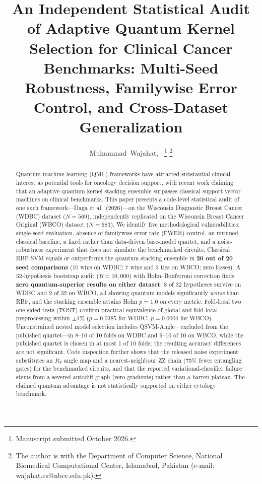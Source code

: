 \documentclass[journal,twocolumn]{IEEEtran}
\begin{document}

\title{An Independent Statistical Audit of Adaptive Quantum Kernel Selection for Clinical Cancer Benchmarks: Multi-Seed Robustness, Familywise Error Control, and Cross-Dataset Generalization}

\author{Muhammad~Wajahat,~%
\thanks{Manuscript submitted October 2026.}%
\thanks{The author is with the Department of Computer Science, National Biomedical Computational Center, Islamabad, Pakistan (e-mail: wajahat.cs@nbcc.edu.pk).}}

\maketitle

\begin{abstract}
Quantum machine learning (QML) frameworks have attracted substantial clinical interest as potential tools for oncology decision support, with recent work claiming that an adaptive quantum kernel stacking ensemble surpasses classical support vector machines on clinical benchmarks. This paper presents a code-level statistical audit of one such framework---Daga et al.\ (2026)---on the Wisconsin Diagnostic Breast Cancer (WDBC) dataset ($N=569$), independently replicated on the Wisconsin Breast Cancer Original (WBCO) dataset ($N=683$). We identify five methodological vulnerabilities: single-seed evaluation, absence of familywise error rate (FWER) control, an untuned classical baseline, a fixed rather than data-driven base-model quartet, and a noise-robustness experiment that does not simulate the benchmarked circuits. Classical RBF-SVM equals or outperforms the quantum stacking ensemble in \textbf{20 out of 20 seed comparisons} (10 wins on WDBC; 7 wins and 3 ties on WBCO; zero losses). A 32-hypothesis bootstrap audit ($B=10{,}000$) with Holm--Bonferroni correction finds \textbf{zero quantum-superior results on either dataset}: 8 of 32 hypotheses survive on WDBC and 2 of 32 on WBCO, all showing quantum models significantly \emph{worse} than RBF, and the stacking ensemble attains Holm $p=1.0$ on every metric. Fold-local two one-sided tests (TOST) confirm practical equivalence of global and fold-local preprocessing within $\pm 1\%$ ($p = 0.0385$ for WDBC, $p = 0.0004$ for WBCO). Unconstrained nested model selection includes QSVM-Angle---excluded from the published quartet---in 8--10 of 10 folds on WDBC and 9--10 of 10 on WBCO, while the published quartet is chosen in at most 1 of 10 folds; the resulting accuracy differences are not significant. Code inspection further shows that the released noise experiment substitutes an $R_Y$ angle map and a nearest-neighbour ZZ chain (75\% fewer entangling gates) for the benchmarked circuits, and that the reported variational-classifier failure stems from a severed autodiff graph (zero gradients) rather than a barren plateau. The claimed quantum advantage is not statistically supported on either cytology benchmark.
\end{abstract}
\end{document}
